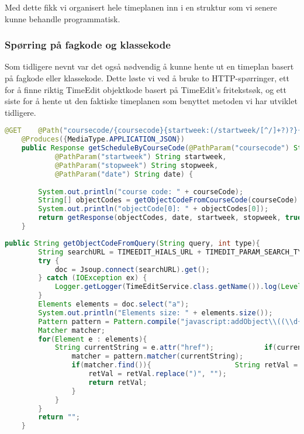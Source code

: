 \documentclass[../main.tex]{subfiles}
\begin{document}
Med dette fikk vi organisert hele timeplanen inn i en struktur som vi senere kunne behandle programmatisk.  

\subsubsection{Spørring på fagkode og klassekode}

Som tidligere nevnt var det også nødvendig å kunne hente ut en timeplan basert på fagkode eller klassekode. Dette løste vi ved å bruke to HTTP-spørringer, ett for å finne riktig TimeEdit objektkode basert på TimeEdit’s fritekstsøk, og ett siste for å hente ut den faktiske timeplanen som benyttet metoden vi har utviklet tidligere.

\begin{lstlisting}[language=Java, frame=single, caption={asdasdsadasdasdasdsadsadasdasdsadsa}]
@GET    @Path("coursecode/{coursecode}{startweek:(/startweek/[^/]+?)?}{stopweek:(/stopweek/[^/]+?)?}{date:(/date/[^/]+?)?}")
    @Produces({MediaType.APPLICATION_JSON})
    public Response getScheduleByCourseCode(@PathParam("coursecode") String courseCode,
            @PathParam("startweek") String startweek,
            @PathParam("stopweek") String stopweek,
            @PathParam("date") String date) {
        
        System.out.println("course code: " + courseCode);
        String[] objectCodes = getObjectCodeFromCourseCode(courseCode).split("/");
        System.out.println("objectCode[0]: " + objectCodes[0]);
        return getResponse(objectCodes, date, startweek, stopweek, true);
    }
\end{lstlisting}

\begin{lstlisting}[language=Java, frame=single, caption={asdasdsadasdasdasdsadsadasdasdsadsa}]
public String getObjectCodeFromQuery(String query, int type){
        String searchURL = TIMEEDIT_HIALS_URL + TIMEDIT_PARAM_SEARCH_TYPE + "=" + type + "&" + TIMEDIT_PARAM_SEARCH + "=" + query;        Document doc = null;
        try {
            doc = Jsoup.connect(searchURL).get();
        } catch (IOException ex) {
            Logger.getLogger(TimeEditService.class.getName()).log(Level.SEVERE, null, ex);
        }
        Elements elements = doc.select("a");
        System.out.println("Elements size: " + elements.size());
        Pattern pattern = Pattern.compile("javascript:addObject\\((\\d{6}|\\d{7})\\)");
        Matcher matcher;
        for(Element e : elements){
            String currentString = e.attr("href");            if(currentString != null && !currentString.isEmpty()){
                matcher = pattern.matcher(currentString);
                if(matcher.find()){                    String retVal = matcher.group().replace("javascript:addObject(", "");
                    retVal = retVal.replace(")", "");
                    return retVal;
                }
            }
        }
        return "";
    }
\end{lstlisting}
\end{document}
